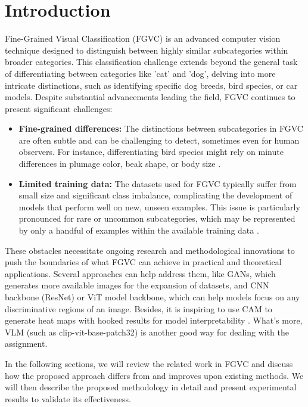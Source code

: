\section{Introduction}
\label{sec:intro}

Fine-Grained Visual Classification (FGVC) is an advanced computer vision technique designed to distinguish between highly similar subcategories within broader categories. This classification challenge extends beyond the general task of differentiating between categories like 'cat' and 'dog', delving into more intricate distinctions, such as identifying specific dog breeds, bird species, or car models. Despite substantial advancements leading the field, FGVC continues to present significant challenges:

\begin{itemize}
    \item \textbf{Fine-grained differences:} The distinctions between subcategories in FGVC are often subtle and can be challenging to detect, sometimes even for human observers. For instance, differentiating bird species might rely on minute differences in plumage color, beak shape, or body size \cite{wei2019survey}.
    \item \textbf{Limited training data:} The datasets used for FGVC typically suffer from small size and significant class imbalance, complicating the development of models that perform well on new, unseen examples. This issue is particularly pronounced for rare or uncommon subcategories, which may be represented by only a handful of examples within the available training data \cite{van2018inaturalist}.
\end{itemize}

These obstacles necessitate ongoing research and methodological innovations to push the boundaries of what FGVC can achieve in practical and theoretical applications. Several approaches can help address them, like GANs, which generates more available images for the expansion of datasets, and CNN backbone (ResNet) or ViT model backbone, which can help models focus on any discriminative regions of an image. Besides, it is inspiring to use CAM to generate heat maps with hooked results for model interpretability \cite{krause2016unreasonable}. What's more, VLM (such as clip-vit-base-patch32) is another good way for dealing with the assignment.

In the following sections, we will review the related work in FGVC and discuss how the proposed approach differs from and improves upon existing methods. We will then describe the proposed methodology in detail and present experimental results to validate its effectiveness.


